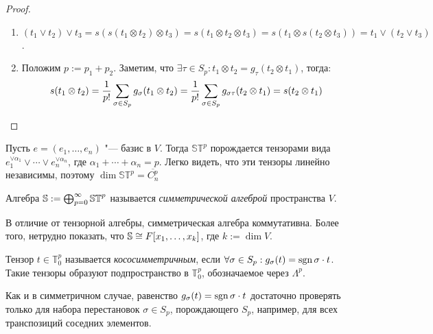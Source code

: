 \begin{proof}~
	\begin{enumerate}
		\item $(t_1\lor t_2)\lor t_3 = s(s(t_1 \otimes t_2) \otimes t_3) = s(t_1 \otimes t_2 \otimes t_3) = s(t_1 \otimes s(t_2 \otimes t_3)) = t_1 \lor (t_2 \lor t_3)$.
		
		\item Положим $p := p_1 + p_2$. Заметим, что $\exists \tau \in S_{p}: t_1 \otimes t_2 = g_\tau(t_2 \otimes t_1)$, тогда:
		\[s(t_1 \otimes t_2) = \frac{1}{p!}\sum_{\sigma \in S_{p}}g_\sigma (t_1 \otimes t_2) = \frac{1}{p!}\sum_{\sigma \in S_{p}}g_{\sigma\tau} (t_2 \otimes t_1) = s(t_2 \otimes t_1)\qedhere\]
	\end{enumerate}
\end{proof}

\begin{note}
	Пусть $e = (e_1, \dotsc, e_n)$ "--- базис в $V$. Тогда $\mathbb{ST}^p$ порождается тензорами вида $e_1^{\lor\alpha_1}\lor\dotsb\lor e_n^{\lor\alpha_n}$, где $\alpha_1 + \dotsb + \alpha_n = p$. Легко видеть, что эти тензоры линейно независимы, поэтому $\dim\mathbb{ST}^p = \overline{C_n^p}$
\end{note}

\begin{definition}
	Алгебра $\mathbb{S}\hm{:=}\bigoplus_{p = 0}^\infty\mathbb{ST}^p$ называется \textit{симметрической алгеброй} пространства $V$.
\end{definition}

\begin{note}
	В отличие от тензорной алгебры, симметрическая алгебра коммутативна. Более того, нетрудно показать, что $\mathbb{S} \hm\cong F[x_1, \dots, x_k]$, где $k := \dim{V}$.
\end{note}

\begin{definition}
	Тензор $t \in \mathbb{T}^p_0$ называется \textit{кососимметричным}, если $\forall \sigma \in S_p: g_\sigma(t) \hm= \sgn\sigma\cdot t$. Такие тензоры образуют подпространство в $\mathbb{T}^p_0$, обозначаемое через $\Lambda^p$.
\end{definition}

\begin{note}
	Как и в симметричном случае, равенство $g_\sigma(t) = \operatorname{\mathop{sgn}}\sigma\cdot t$ достаточно проверять только для набора перестановок $\sigma \in S_p$, порождающего $S_p$, например, для всех транспозиций соседних элементов.
\end{note}

